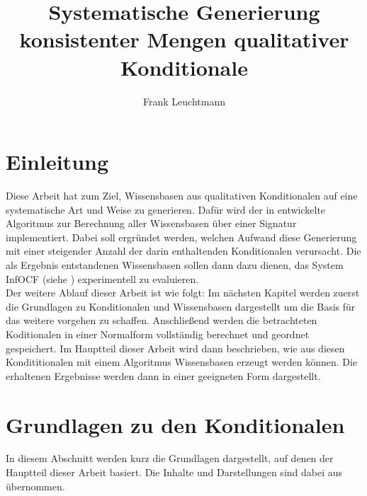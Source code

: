 \documentclass[12pt,a4paper]{article}
\author{Frank Leuchtmann}
\title{Systematische Generierung konsistenter Mengen qualitativer
Konditionale}
\begin{document}
\maketitle
\newpage
\tableofcontents
\newpage
\section{Einleitung}
Diese Arbeit hat zum Ziel, Wissensbasen aus qualitativen Konditionalen auf eine systematische Art und Weise zu generieren. Dafür wird der in \cite{beierle19} entwickelte Algoritmus zur Berechnung aller Wissensbasen über einer Signatur implementiert. Dabei soll ergründet werden, welchen Aufwand diese Generierung mit einer steigender Anzahl der darin  enthaltenden Konditionalen verursacht. Die als Ergebnis entstandenen Wissensbasen sollen dann dazu dienen, das System InfOCF (siehe \cite{beierle17}) experimentell zu evaluieren.
\\
Der weitere Ablauf dieser Arbeit ist wie folgt: Im nächsten Kapitel werden zuerst die Grundlagen zu Konditionalen und Wissensbasen dargestellt um die Basis für das weitere vorgehen zu schaffen. Anschließend werden die betrachteten Koditionalen in einer Normalform vollständig berechnet und geordnet gespeichert. Im Hauptteil dieser Arbeit wird dann beschrieben, wie aus diesen Kondititionalen mit einem Algoritmus \cite{beierle19} Wissensbasen erzeugt werden können. Die erhaltenen Ergebnisse werden dann in einer geeigneten Form dargestellt.
\section{Grundlagen zu den Konditionalen}
In diesem Abschnitt werden kurz die Grundlagen dargestellt, auf denen der Hauptteil dieser Arbeit basiert. Die Inhalte und Darstellungen sind dabei aus \cite{beierle19} übernommen.
\end{document}

